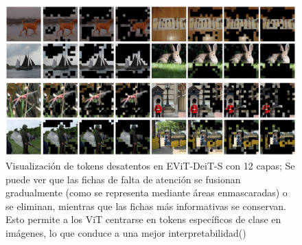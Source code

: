    \begin{figure}[H]
	\begin{center}
		\includegraphics[width=1\textwidth]{2/figures/vt6.jpeg}
		\caption{Visualización de tokens desatentos en EViT-DeiT-S con 12 capas; Se puede ver que las fichas de falta de atención se fusionan gradualmente (como se representa mediante áreas enmascaradas) o se eliminan, mientras que las fichas más informativas se conservan. Esto permite a los ViT centrarse en tokens específicos de clase en imágenes, lo que conduce a una mejor interpretabilidad(\cite{tecnica1})}
	\end{center}
\end{figure}


